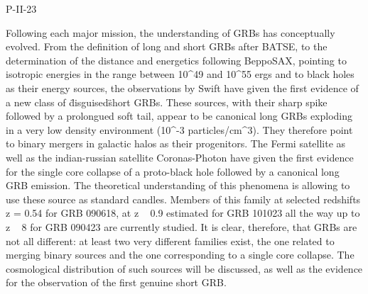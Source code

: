 P-II-23


\bigskip



\bigskip

\noindent Following each major mission, the understanding of GRBs has conceptually evolved. From the definition of long and short GRBs after BATSE, to the determination of the distance and energetics following BeppoSAX, pointing to isotropic energies in the range between 10^{49} and 10^{55} ergs and to black holes as their energy sources, the observations by Swift have given the first evidence of a new class of \"disguised\" short GRBs. These sources, with their sharp spike followed by a prolongued soft tail, appear to be canonical long GRBs exploding in a very low density environment (10^{-3} particles/cm^3). They therefore point to binary mergers in galactic halos as their progenitors. The Fermi satellite as well as the indian-russian satellite Coronas-Photon have given the first evidence for the single core collapse of a proto-black hole followed by a canonical long GRB emission. The theoretical understanding of this phenomena is allowing to use these source as standard candles. Members of this family at selected redshifts z = 0.54 for GRB 090618, at z ~ 0.9 estimated for GRB 101023 all the way up to z ~ 8 for GRB 090423 are currently studied. It is clear, therefore, that GRBs are not all different: at least two very different families exist, the one related to merging binary sources and the one corresponding to a single core collapse. The cosmological distribution of such sources will be discussed, as well as the evidence for the observation of the first genuine short GRB.
